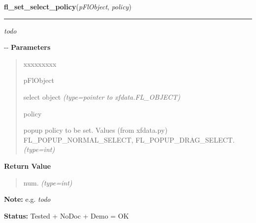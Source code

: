     \vspace{0.5ex}

\hspace{.8\funcindent}\begin{boxedminipage}{\funcwidth}

    \raggedright \textbf{fl\_set\_select\_policy}(\textit{pFlObject}, \textit{policy})

    \vspace{-1.5ex}

    \rule{\textwidth}{0.5\fboxrule}
\setlength{\parskip}{2ex}

\emph{todo}

-{}-
\setlength{\parskip}{1ex}
      \textbf{Parameters}
      \vspace{-1ex}

      \begin{quote}
        \begin{Ventry}{xxxxxxxxx}

          \item[pFlObject]


select object
            {\it (type=pointer to xfdata.FL\_OBJECT)}

          \item[policy]


popup policy to be set. Values (from xfdata.py) FL\_POPUP\_NORMAL\_SELECT,
FL\_POPUP\_DRAG\_SELECT.
            {\it (type=int)}

        \end{Ventry}

      \end{quote}

      \textbf{Return Value}
    \vspace{-1ex}

      \begin{quote}

num.
      {\it (type=int)}

      \end{quote}

\textbf{Note:} 
e.g. \emph{todo}


\textbf{Status:} 
Tested + NoDoc + Demo = OK


    \end{boxedminipage}




